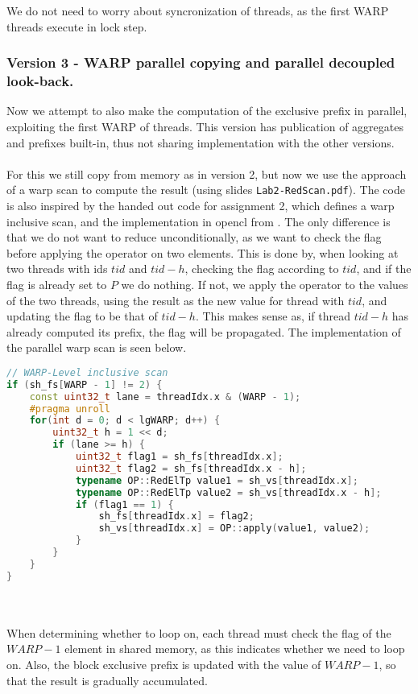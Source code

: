 We do not need to worry about syncronization of threads, as the first WARP threads execute in lock step.

\subsubsection{Version 3 - WARP parallel copying and parallel decoupled look-back.}
Now we attempt to also make the computation of the exclusive prefix in parallel, exploiting the first WARP of threads.
This version has publication of aggregates and prefixes built-in, thus not sharing implementation with the other versions.
\\~\\
For this we still copy from memory as in version 2, but now we use the approach of a warp scan to compute the result (using slides \texttt{Lab2-RedScan.pdf}).
The code is also inspired by the handed out code for assignment 2, which defines a warp inclusive scan, and the implementation in opencl from \cite{opencl}.
The only difference is that we do not want to reduce unconditionally, as we want to check the flag before applying the operator on two elements.
This is done by, when looking at two threads with ids $tid$ and $tid - h$, checking the flag according to $tid$, and if the flag is already set to $P$ we do nothing.
If not, we apply the operator to the values of the two threads, using the result as the new value for thread with $tid$, and updating the flag to be that of $tid - h$.
This makes sense as, if thread $tid -h$ has already computed its prefix, the flag will be propagated.
The implementation of the parallel warp scan is seen below.
\begin{lstlisting}[language=c++]
// WARP-Level inclusive scan
if (sh_fs[WARP - 1] != 2) {
    const uint32_t lane = threadIdx.x & (WARP - 1);
    #pragma unroll
    for(int d = 0; d < lgWARP; d++) {
        uint32_t h = 1 << d;
        if (lane >= h) {
            uint32_t flag1 = sh_fs[threadIdx.x];
            uint32_t flag2 = sh_fs[threadIdx.x - h];
            typename OP::RedElTp value1 = sh_vs[threadIdx.x];
            typename OP::RedElTp value2 = sh_vs[threadIdx.x - h];
            if (flag1 == 1) {
                sh_fs[threadIdx.x] = flag2;
                sh_vs[threadIdx.x] = OP::apply(value1, value2);
            }
        }
    }
}
\end{lstlisting}

\\~\\
When determining whether to loop on, each thread must check the flag of the $WARP - 1$ element in shared memory, as this indicates whether we need to loop on.
Also, the block exclusive prefix is updated with the value of $WARP - 1$, so that the result is gradually accumulated.

